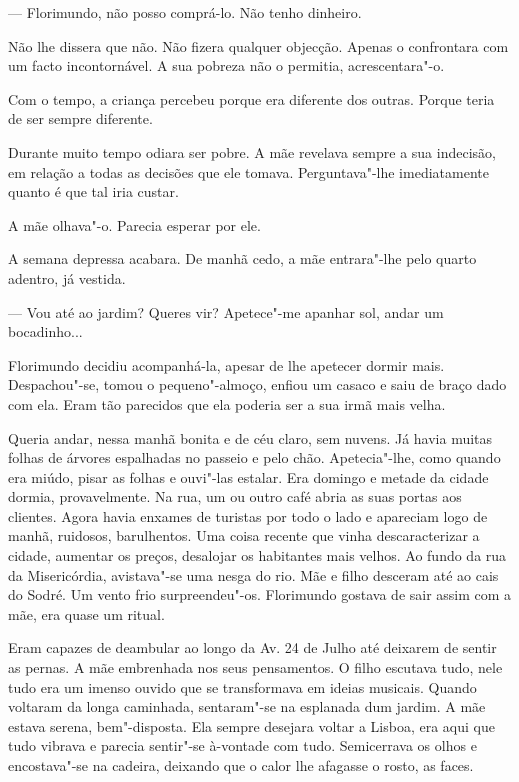 --- Florimundo, não posso comprá-lo. Não tenho dinheiro.

Não lhe dissera que não. Não fizera qualquer objecção. Apenas o
confrontara com um facto incontornável. A sua pobreza não o permitia,
acrescentara"-o.

Com o tempo, a criança percebeu porque era diferente dos outras. Porque
teria de ser sempre diferente.

Durante muito tempo odiara ser pobre. A mãe revelava sempre a sua
indecisão, em relação a todas as decisões que ele tomava. Perguntava"-lhe
imediatamente quanto é que tal iria custar.

A mãe olhava"-o. Parecia esperar por ele.

A semana depressa acabara. De manhã cedo, a mãe entrara"-lhe pelo quarto
adentro, já vestida.

--- Vou até ao jardim? Queres vir? Apetece"-me apanhar sol, andar um
bocadinho...

Florimundo decidiu acompanhá-la, apesar de lhe apetecer dormir mais.
Despachou"-se, tomou o pequeno"-almoço, enfiou um casaco e saiu de braço
dado com ela. Eram tão parecidos que ela poderia ser a sua irmã mais
velha.

Queria andar, nessa manhã bonita e de céu claro, sem nuvens. Já havia
muitas folhas de árvores espalhadas no passeio e pelo chão.
Apetecia"-lhe, como quando era miúdo, pisar as folhas e ouvi"-las estalar.
Era domingo e metade da cidade dormia, provavelmente. Na rua, um ou
outro café abria as suas portas aos clientes. Agora havia enxames de
turistas por todo o lado e apareciam logo de manhã, ruidosos,
barulhentos. Uma coisa recente que vinha descaracterizar a cidade,
aumentar os preços, desalojar os habitantes mais velhos. Ao fundo da rua
da Misericórdia, avistava"-se uma nesga do rio. Mãe e filho desceram até
ao cais do Sodré. Um vento frio surpreendeu"-os. Florimundo gostava de
sair assim com a mãe, era quase um ritual.

Eram capazes de deambular ao longo da Av. 24 de Julho até deixarem de
sentir as pernas. A mãe embrenhada nos seus pensamentos. O filho
escutava tudo, nele tudo era um imenso ouvido que se transformava em
ideias musicais. Quando voltaram da longa caminhada, sentaram"-se na
esplanada dum jardim. A mãe estava serena, bem"-disposta. Ela sempre
desejara voltar a Lisboa, era aqui que tudo vibrava e parecia sentir"-se
à-vontade com tudo. Semicerrava os olhos e encostava"-se na cadeira,
deixando que o calor lhe afagasse o rosto, as faces.

